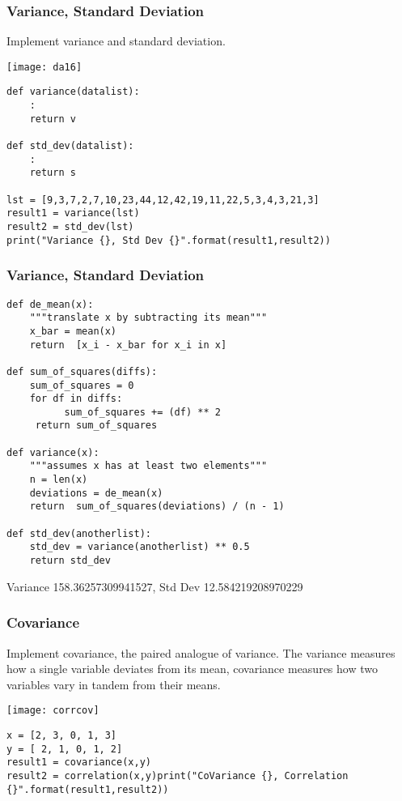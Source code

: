 \begin{frame}[fragile]\frametitle{Variance, Standard Deviation}
Implement variance and standard deviation.
\begin{center}
\texttt{[image: da16]}
\end{center}

\begin{lstlisting}
def variance(datalist):
	:
	return v

def std_dev(datalist):
	:
	return s

lst = [9,3,7,2,7,10,23,44,12,42,19,11,22,5,3,4,3,21,3]
result1 = variance(lst)
result2 = std_dev(lst)
print("Variance {}, Std Dev {}".format(result1,result2))
\end{lstlisting}
\end{frame}

\begin{frame}[fragile]\frametitle{Variance, Standard Deviation}
\begin{lstlisting}
def de_mean(x):
	"""translate x by subtracting its mean"""
	x_bar = mean(x)
	return	[x_i - x_bar for x_i in x]

def sum_of_squares(diffs):
	sum_of_squares = 0
	for df in diffs:
          sum_of_squares += (df) ** 2
     return sum_of_squares

def variance(x):
	"""assumes x has at	least two elements"""
	n = len(x)
	deviations = de_mean(x)
	return	sum_of_squares(deviations) / (n - 1)
 
def std_dev(anotherlist):
	std_dev = variance(anotherlist) ** 0.5
	return std_dev
\end{lstlisting}
Variance 158.36257309941527, Std Dev 12.584219208970229
\end{frame}


\begin{frame}[fragile]\frametitle{Covariance}
Implement covariance, the paired analogue of variance.
The variance measures how a single variable deviates from its mean, covariance measures how two variables vary in tandem from their means.
\begin{center}
\texttt{[image: corrcov]}
\end{center}
\begin{lstlisting}
x = [2, 3, 0, 1, 3]
y = [ 2, 1, 0, 1, 2]
result1 = covariance(x,y)
result2 = correlation(x,y)print("CoVariance {}, Correlation {}".format(result1,result2))
\end{lstlisting}
\end{frame}

